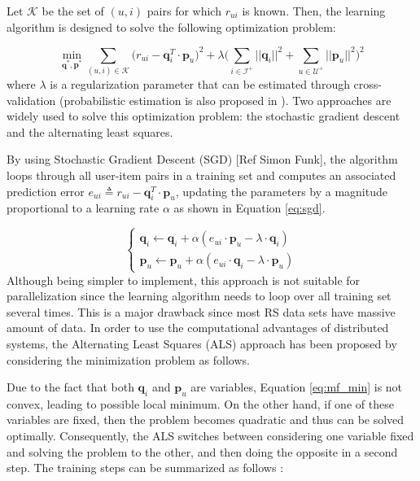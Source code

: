     Let $\mathcal{K}$ be the set of $(u,i)$ pairs for which $r_{ui}$ is known. Then, the learning algorithm is designed to solve the following optimization problem: 
    
    \begin{equation}
        \label{eq:mf_min}
        \min_{\mathbf{q}^*, \mathbf{p}^*} \sum_{(u,i) \in \mathcal{K}} \bigg(r_{ui} - \mathbf{q}^T_i \cdot \mathbf{p}_u\bigg)^2 + \lambda \bigg(\sum_{i \in \mathcal{I}^+}||\mathbf{q}_i||^2 + \sum_{u \in \mathcal{U}^+}||\mathbf{p}_u||^2 \bigg)^2
    \end{equation} where $\lambda$ is a regularization parameter that can be estimated through cross-validation (probabilistic estimation is also proposed in \cite{2007ProbMF}). Two approaches are widely used to solve this optimization problem: the stochastic gradient descent and the alternating least squares. 
    
    By using Stochastic Gradient Descent (SGD)  [Ref Simon Funk], the algorithm loops through all user-item pairs in a training set and computes an associated prediction error $e_{ui} \triangleq r_{ui} - \mathbf{q}^T_i \cdot \mathbf{p}_u$, updating the parameters by a magnitude proportional to a learning rate $\alpha$ as shown in Equation \ref{eq:sgd}.
    
    \begin{equation}
        \label{eq:sgd}
            \begin{cases}
            \mathbf{q}_i \leftarrow \mathbf{q}_i + \alpha (e_{ui}\cdot \mathbf{p}_u-\lambda \cdot \mathbf{q}_i) \\
            
            \mathbf{p}_u \leftarrow \mathbf{p}_u + \alpha (e_{ui}\cdot \mathbf{q}_i-\lambda \cdot \mathbf{p}_u)
            \end{cases}
    \end{equation} Although being simpler to implement, this approach is not suitable for parallelization since the learning algorithm needs to loop over all training set several times. This is a major drawback since most RS data sets have massive amount of data. In order to use the computational advantages of distributed systems, the Alternating Least Squares (ALS)  approach has been proposed by considering the minimization problem as follows.

    
    Due to the fact that both $\mathbf{q}_i$ and $\mathbf{p}_u$ are variables, Equation \ref{eq:mf_min} is not convex, leading to possible local minimum. On the other hand, if one of these variables are fixed, then the problem becomes quadratic and thus can be solved optimally. Consequently, the ALS switches between considering one variable fixed and solving the problem to the other, and then doing the opposite in a second step. The training steps can be summarized as follows \cite{2008ALSWR}:
    
